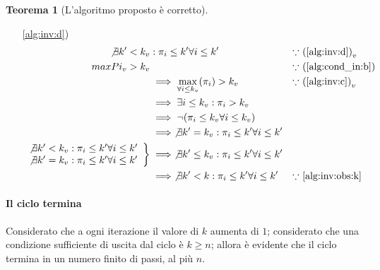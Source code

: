 \documentclass{article}
\theoremstyle{definition}
\newtheorem{theorem}{Teorema}
\begin{document}
\begin{theorem}[L'algoritmo proposto è corretto]
\begin{itemize}
        \item[\ref{alg:inv:d})]
              \begin{align*}
                  \not\exists k' < k_v & : \pi_i \leq k' \forall i \leq k'                                  & \because & \mbox{ (\ref{alg:inv:d})}_v   \\
                  maxPi_v > k_v        &                                                                    & \because & \mbox{ (\ref{alg:cond_in:b})} \\
                                       & \implies \max_{\forall i \leq k_v}(\pi_i) > k_v                    & \because & \mbox{ (\ref{alg:inv:c})}_v   \\
                                       & \implies \exists i \leq k_v : \pi_i > k_v                                                                     \\
                                       & \implies \neg(\pi_i \leq k_v \forall i \leq k_v)                                                              \\
                                       & \implies \not\exists k' = k_v : \pi_i \leq k' \forall i \leq k'                                               \\
                  \left.
                  \begin{array}[]{r}
                      \not\exists k' < k_v : \pi_i \leq k' \forall i \leq k' \\
                      \not\exists k' = k_v : \pi_i \leq k' \forall i \leq k'
                  \end{array}
                  \right\}
                                       & \implies \not\exists k' \leq k_v : \pi_i \leq k' \forall i \leq k'                                            \\
                                       & \implies \not\exists k' < k : \pi_i \leq k' \forall i \leq k'      & \because & \mbox{ \ref{alg:inv:obs:k}}
              \end{align*}

    \end{itemize}

    \paragraph{Il ciclo termina}
    Considerato che a ogni iterazione il valore di $k$ aumenta di $1$;
    considerato che una condizione sufficiente di uscita dal ciclo è $k \geq n$;
    allora è evidente che il ciclo termina in un numero finito di passi, al più $n$.
    

\end{theorem}
\end{document}
